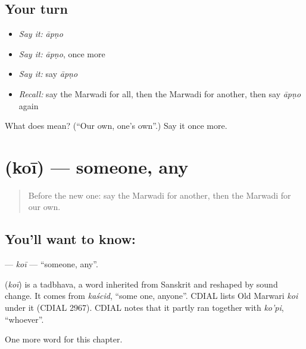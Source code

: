 \subsection*{Your turn}
\begin{itemize}
\raggedright
  \item \emph{Say it:} \emph{āpṇo}
  \item \emph{Say it:} \emph{āpṇo}, once more
  \item \emph{Say it:} say \emph{āpṇo}
  \item \emph{Recall:} say the Marwadi for all, then the Marwadi for another, then say \emph{āpṇo} again
\end{itemize}

\begin{tcolorbox}[breakable,colback=teal!4,colframe=teal!35!black,title={Before you move on}]
What does  mean? (\textquotedblleft{}Our own, one's own\textquotedblright{}.) Say it once more.
\end{tcolorbox}
\section[\texorpdfstring{\mw{कोई} (koī)}{कोई (koī)}]{ (koī) — someone, any}

\label{lesson:MW-C102-koi}



\begin{quote}
Before the new one: say the Marwadi for another, then the Marwadi for our own.
\end{quote}

\subsection*{You'll want to know: }
\textbf{} — \emph{koī} — \textquotedblleft{}someone, any\textquotedblright{}.

\begin{cousinweb}
\textbf{} (\emph{koī}) is a tadbhava, a word inherited from Sanskrit and reshaped by sound change. It comes from \emph{kaścid}, \textquotedblleft{}some one, anyone\textquotedblright{}. CDIAL lists Old Marwari \emph{koi} under it (CDIAL 2967). CDIAL notes that it partly ran together with \emph{ko'pi}, \textquotedblleft{}whoever\textquotedblright{}.
\end{cousinweb}

\begin{grammarlens}[title={What you've built}]
One more word for this chapter.
\end{grammarlens}

